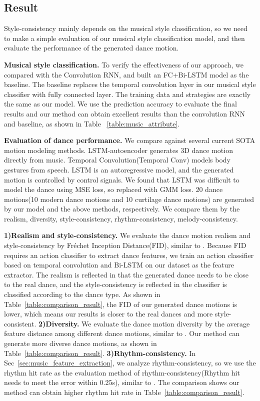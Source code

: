 \subsection{Result}\label{sec:our_result}
Style-consistency mainly depends on the musical style classification, so we need to make a simple evaluation of our musical style classification model, and then evaluate the performance of the generated dance motion.

\textbf{Musical style classification.}
To verify the effectiveness of our approach, we compared with the Convolution RNN\cite{choi2017convolutional}, and built an FC+Bi-LSTM model as the baseline. The baseline
replaces the temporal convolution layer in our musical style classifier with fully connected layer. The training data 
and strategies are exactly the same as our model.
We use the prediction accuracy to evaluate the final results and our method can obtain excellent results than the convolution RNN and baseline, as shown in Table ~\ref{table:music_attribute}.

\textbf{Evaluation of dance performance.}
We compare against several current SOTA motion modeling methods. 
LSTM-autoencoder\cite{tang2018dance} generates 3D dance motion directly from music. Temporal Convolution(Temporal Conv)\cite{ginosar2019learning} models body gestures from speech. LSTM\cite{lee2018interactive} is an autoregressive model, and the generated motion is controlled by control signals. We found that LSTM was difficult to model the dance using MSE loss, so replaced with GMM loss.
20 dance motions(10 modern dance motions and 10 curtilage dance motions) are generated by our model and the above methods, respectively.
We compare them by the realism, diversity, style-consistency, rhythm-consistency, melody-consistency. 

\textbf{1)Realism and style-consistency.}
We evaluate the dance motion realism and style-consistency by Fr\'echet Inception Distance(FID)\cite{heusel2017gans}, similar to \cite{yan2019convolutional}. Because FID requires an action classifier to extract dance features, we train an action classifier based on temporal convolution and Bi-LSTM on our dataset as the feature extractor.
The realism is reflected in that the generated dance needs to be close to the real dance, and the style-consistency is reflected in the classifier is classified according to the dance type. As shown in Table~\ref{table:comparison_result}, the FID of our generated dance motions is lower, which means our results is closer to the real dances and more style-consistent.
\textbf{2)Diversity.} We evaluate the dance motion diversity by 
the average feature distance among different dance motions, similar to \cite{lee2019dancing}. Our method can generate more diverse dance motions, as shown in Table~\ref{table:comparison_result}. 
\textbf{3)Rhythm-consistency.} In Sec~\ref{sec:music_feature_extraction}, we analyze rhythm-consistency, so we use the rhythm hit rate as the evaluation method of rhythm-consistency(Rhythm hit needs to meet the error within 0.25s), similar to \cite{lee2019dancing}. The comparison shows our method can obtain higher rhythm hit rate in Table~\ref{table:comparison_result}.

